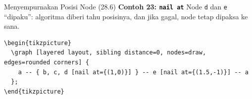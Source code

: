 \documentclass[aspectratio=169]{beamer}
\begin{document}
\begin{frame}{Menyempurnakan Posisi Node (28.6)}
\textbf{Contoh 23: \texttt{nail at}}
Node \texttt{d} dan \texttt{e} ``dipaku'': algoritma diberi tahu posisinya, dan jika gagal, node tetap dipaksa ke sana.
\begin{lstlisting}
\begin{tikzpicture}
  \graph [layered layout, sibling distance=0, nodes=draw, edges=rounded corners] {
    a -- { b, c, d [nail at={(1,0)}] } -- e [nail at={(1.5,-1)}] -- a
  };
\end{tikzpicture}
\end{lstlisting}
\begin{center}\end{center}



\end{frame}
\end{document}
